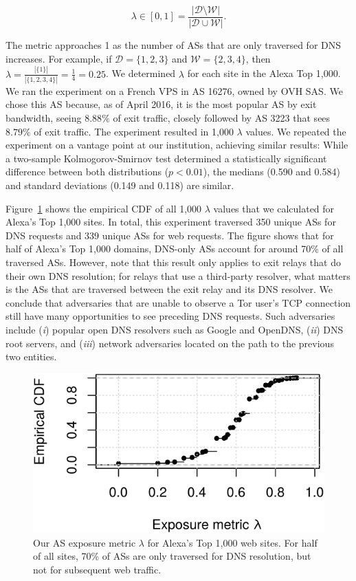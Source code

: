 \begin{equation}
\label{equ:exposure}
\lambda \in [0, 1] =
\frac{|\mathcal{D} \setminus \mathcal{W}|}
     {|\mathcal{D} \cup \mathcal{W}|}.
\end{equation}

The metric approaches 1 as the number of ASs that are only traversed for DNS
increases.  For example, if $\mathcal{D} = \{1,2,3\}$ and $\mathcal{W} =
\{2,3,4\}$, then $\lambda = \frac{|\{1\}|}{|\{1,2,3,4\}|} = \frac{1}{4} =
0.25$.  We determined $\lambda$ for each site in the Alexa Top 1,000.  We ran
the experiment on a French VPS in AS 16276, owned by OVH SAS.  We chose this AS
because, as of April 2016, it is the most popular AS by exit bandwidth, seeing
$8.88\%$ of exit traffic, closely followed by AS 3223 that sees $8.79\%$ of
exit traffic.  The experiment resulted in 1,000 $\lambda$ values.  We repeated
the experiment on a vantage point at our institution, achieving similar
results: While a two-sample Kolmogorov-Smirnov test determined a statistically
significant difference between both distributions ($p < 0.01$), the medians
(0.590 and 0.584) and standard deviations (0.149 and 0.118) are similar.

Figure~\ref{fig:exposure} shows the empirical CDF of all 1,000 $\lambda$ values
that we calculated for Alexa's Top 1,000 sites.  In total, this experiment
traversed 350 unique ASs for DNS requests and 339 unique ASs for web requests.
The figure shows that for half of Alexa's Top 1,000 domains, DNS-only ASs
account for around 70\% of all traversed ASs.  However, note that this result
only applies to exit relays that do their own DNS resolution; for relays that
use a third-party resolver, what matters is the ASs that are traversed between
the exit relay and its DNS resolver.  We conclude that adversaries that are
unable to observe a Tor user's TCP connection still have many opportunities to
see preceding DNS requests.  Such adversaries include (\emph{i}) popular open
DNS resolvers such as Google and OpenDNS, (\emph{ii}) DNS root servers, and
(\emph{iii}) network adversaries located on the path to the previous two
entities.


\begin{figure}[t]
	\centering
	\includegraphics[width=0.7\linewidth]{figures/dns-exposure.pdf}
	\caption{Our AS exposure metric $\lambda$ for Alexa's Top 1,000 web sites.
	For half of all sites, 70\% of ASs are only traversed for DNS resolution,
	but not for subsequent web traffic.}
	\label{fig:exposure}
\end{figure}

